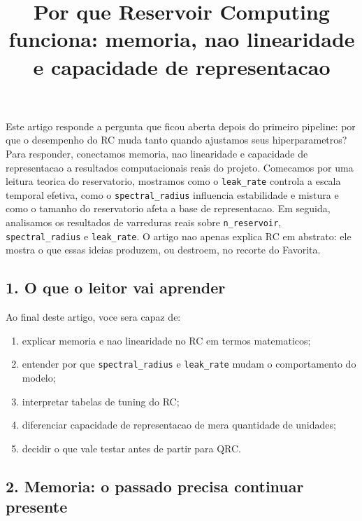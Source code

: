 \documentclass[12pt]{article}
\title{Por que Reservoir Computing funciona: memoria, nao linearidade e capacidade de representacao}
\author{}
\providecommand{\tightlist}{%
          \setlength{\itemsep}{0pt}\setlength{\parskip}{0pt}}
\begin{document}
        \maketitle

        \begin{resumo}
        Este artigo responde a pergunta que ficou aberta depois do primeiro pipeline: por que o desempenho do RC muda tanto quando ajustamos seus hiperparametros? Para responder, conectamos memoria, nao linearidade e capacidade de representacao a resultados computacionais reais do projeto. Comecamos por uma leitura teorica do reservatorio, mostramos como o \texttt{leak\_rate} controla a escala temporal efetiva, como o \texttt{spectral\_radius} influencia estabilidade e mistura e como o tamanho do reservatorio afeta a base de representacao. Em seguida, analisamos os resultados de varreduras reais sobre \texttt{n\_reservoir}, \texttt{spectral\_radius} e \texttt{leak\_rate}. O artigo nao apenas explica RC em abstrato: ele mostra o que essas ideias produzem, ou destroem, no recorte do Favorita.
        \end{resumo}

        \subsection{1. O que o leitor vai aprender}\label{1-o-que-o-leitor-vai-aprender}

Ao final deste artigo, voce sera capaz de:

\begin{enumerate}
\def\labelenumi{\arabic{enumi}.}
\tightlist
\item
  explicar memoria e nao linearidade no RC em termos matematicos;
\item
  entender por que \texttt{spectral\_radius} e \texttt{leak\_rate} mudam o comportamento do modelo;
\item
  interpretar tabelas de tuning do RC;
\item
  diferenciar capacidade de representacao de mera quantidade de unidades;
\item
  decidir o que vale testar antes de partir para QRC.
\end{enumerate}

\subsection{2. Memoria: o passado precisa continuar presente}\label{2-memoria-o-passado-precisa-continuar-presente}
\end{document}
